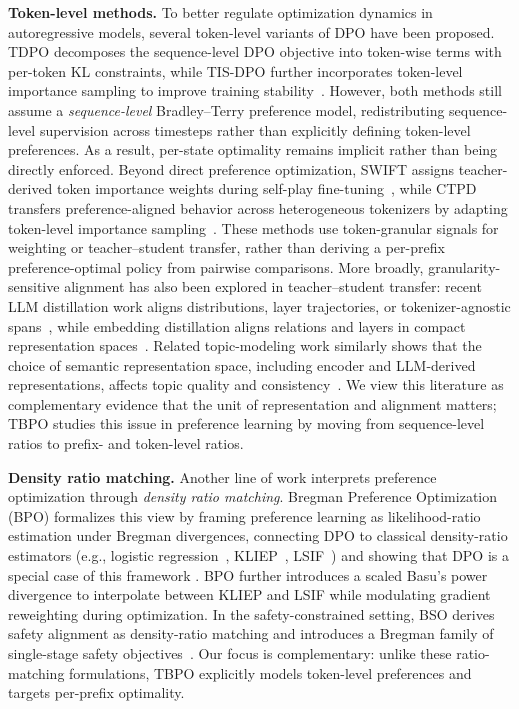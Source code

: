 \documentclass{article}
\theoremstyle{plain}
\theoremstyle{definition}
\theoremstyle{remark}
\begin{document}
\textbf{Token-level methods.}
To better regulate optimization dynamics in autoregressive models, several token-level variants of DPO have been proposed. TDPO decomposes the sequence-level DPO objective into token-wise terms with per-token KL constraints, while TIS-DPO further incorporates token-level importance sampling to improve training stability~\citep{zeng2024tokenleveldirectpreferenceoptimization,tis-dpo}. However, both methods still assume a \emph{sequence-level} Bradley–Terry preference model, redistributing sequence-level supervision across timesteps rather than explicitly defining token-level preferences. As a result, per-state optimality remains implicit rather than being directly enforced.
Beyond direct preference optimization, SWIFT assigns teacher-derived token importance weights during self-play fine-tuning~\citep{le2025token}, while CTPD transfers preference-aligned behavior across heterogeneous tokenizers by adapting token-level importance sampling~\citep{truong2026ctpd}. These methods use token-granular signals for weighting or teacher--student transfer, rather than deriving a per-prefix preference-optimal policy from pairwise comparisons.
More broadly, granularity-sensitive alignment has also been explored in teacher--student transfer: recent LLM distillation work aligns distributions, layer trajectories, or tokenizer-agnostic spans~\citep{hoang2026mcw,chi2026mta,dao2026sra}, while embedding distillation aligns relations and layers in compact representation spaces~\citep{truong2025emo,an2026mol,huy2026mipic}. Related topic-modeling work similarly shows that the choice of semantic representation space, including encoder and LLM-derived representations, affects topic quality and consistency~\citep{nguyen-etal-2025-xtra,DBLP:conf/aaai/PhatMVDN26,xuan2026llmxtmenhancingcrosslingualtopic}. We view this literature as complementary evidence that the unit of representation and alignment matters; TBPO studies this issue in preference learning by moving from sequence-level ratios to prefix- and token-level ratios.

\textbf{Density ratio matching.}
Another line of work interprets preference optimization through \emph{density ratio matching}.
Bregman Preference Optimization (BPO) formalizes this view by framing preference learning as likelihood-ratio estimation under Bregman divergences, connecting DPO to classical density-ratio estimators (e.g., logistic regression~\cite{JMLR:v13:gutmann12a}, KLIEP~\cite{NIPS2007_be83ab3e}, LSIF~\cite{lsif}) and showing that DPO is a special case of this framework \citep{kim2025preferenceoptimizationestimatingratio}.
BPO further introduces a scaled Basu's power divergence to interpolate between KLIEP and LSIF while modulating gradient reweighting during optimization.
In the safety-constrained setting, BSO derives safety alignment as density-ratio matching and introduces a Bregman family of single-stage safety objectives~\citep{nguyen2026bsosafetyalignmentdensity}.
Our focus is complementary: unlike these ratio-matching formulations, TBPO explicitly models token-level preferences and targets per-prefix optimality.
\end{document}
